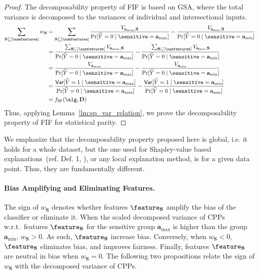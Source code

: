 \begin{proof}
	The decomposability property of FIF is based on GSA, where the total variance is decomposed to the variances of individual and intersectional inputs. 
	\begin{align*}
		\sum_{\mathbf{S} \subseteq [\numfeatures]} w_{\mathbf{S}} &= \sum_{\mathbf{S} \subseteq [\numfeatures]} \frac{V_{\mathbf{a}_{\max}, \mathbf{S}}}{ \Pr[\widehat{Y} = 0 \mid  \sensitive = \mathbf{a}_{\max}]} - \frac{V_{\mathbf{a}_{\min}, \mathbf{S}} }{\Pr[\widehat{Y} = 0 \mid  \sensitive = \mathbf{a}_{\min}]}\\
		&= \frac{\sum_{\mathbf{S} \subseteq [\numfeatures]} V_{\mathbf{a}_{\max}, \mathbf{S}}}{ \Pr[\widehat{Y} = 0 \mid  \sensitive = \mathbf{a}_{\max}]} - \frac{\sum_{\mathbf{S} \subseteq [\numfeatures]} V_{\mathbf{a}_{\min}, \mathbf{S}} }{\Pr[\widehat{Y} = 0 \mid  \sensitive = \mathbf{a}_{\min}]}\\
		&= \frac{V_{\mathbf{a}_{\max}}}{ \Pr[\widehat{Y} = 0 \mid  \sensitive = \mathbf{a}_{\max}]} - \frac{V_{\mathbf{a}_{\min}} }{\Pr[\widehat{Y} = 0 \mid  \sensitive = \mathbf{a}_{\min}]}\\
		&=\frac{\mathsf{Var}[\widehat{Y} = 1\mid\sensitive = \mathbf{a}_{\max}]}{\Pr[\widehat{Y} = 0 \mid  \sensitive = \mathbf{a}_{\max}]} - \frac{\mathsf{Var}[\widehat{Y} = 1\mid\sensitive = \mathbf{a}_{\min}] }{\Pr[\widehat{Y} = 0 \mid  \sensitive = \mathbf{a}_{\min}]}\\
		&= f_{\mathsf{SP}}(\alg, \mathbf{D})
	\end{align*}
	Thus, applying Lemma~\ref{lm:sp_var_relation}, we prove the decomposability property of FIF for statistical parity.
	
	
\end{proof}

We emphasize that the decomposability property proposed here is global, i.e. it holds for a whole dataset, but the one used for Shapley-value based explanations~(ref. Def. 1, \citep{lundberg2017unified}), or any local explanation method, is for a given data point. Thus, they are fundamentally different.



\paragraph{Bias Amplifying and Eliminating Features.} The sign of $ w_{\mathbf{S}} $ denotes whether features $ \feature_{\mathbf{S}} $ amplify the bias of the classifier or eliminate it. When the scaled decomposed variance of CPPs w.r.t.\ features $ \feature_{\mathbf{S}} $ for the sensitive group $ \mathbf{a}_{\max} $ is higher than the group $ \mathbf{a}_{\min} $, $ w_{\mathbf{S}} > 0 $. As such, $ \feature_{\mathbf{S}} $ increase bias. Conversely, when $ w_{\mathbf{S}} < 0 $, $ \feature_{\mathbf{S}} $ eliminates bias, and improves fairness. Finally, features $ \feature_{\mathbf{S}} $ are neutral in bias when $ w_{\mathbf{S}} = 0 $. The following two propositions relate the sign of $ w_{\mathbf{S}} $ with the decomposed variance of CPPs.

